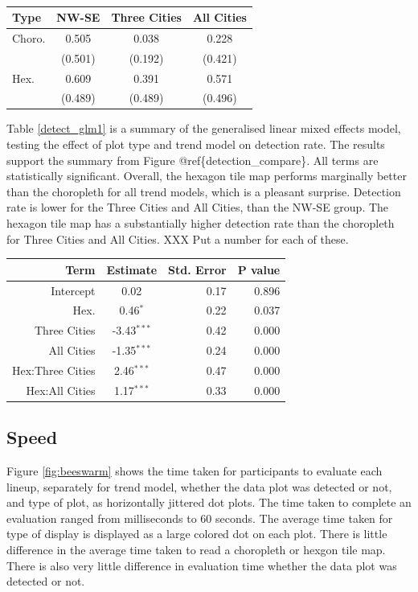 \documentclass[conference,final,]{IEEEtran}
\begin{document}
\begin{table}

\caption{\label{tab:desc_stats}}
\centering
\begin{tabular}[t]{lccc}
\toprule
Type & NW-SE & Three Cities & All Cities\\
\midrule
Choro. & 0.505 & 0.038 & 0.228\\
 & (0.501) & (0.192) & (0.421)\\
Hex. & 0.609 & 0.391 & 0.571\\
 & (0.489) & (0.489) & (0.496)\\
\bottomrule
\end{tabular}
\end{table}

Table \ref{detect_glm1} is a summary of the generalised linear mixed
effects model, testing the effect of plot type and trend model on
detection rate. The results support the summary from Figure
@ref\{detection\_compare\}. All terms are statistically significant.
Overall, the hexagon tile map performs marginally better than the
choropleth for all trend models, which is a pleasant surprise. Detection
rate is lower for the Three Cities and All Cities, than the NW-SE group.
The hexagon tile map has a substantially higher detection rate than the
choropleth for Three Cities and All Cities. XXX Put a number for each of
these.

\begin{tabular}{rcrr}
\toprule
Term & Estimate & Std. Error & P value\\
\midrule
Intercept & 0.02 & 0.17 & 0.896\\
Hex. & 0.46$^{*  }$ & 0.22 & 0.037\\
Three Cities & -3.43$^{***}$ & 0.42 & 0.000\\
All Cities & -1.35$^{***}$ & 0.24 & 0.000\\
Hex:Three Cities & 2.46$^{***}$ & 0.47 & 0.000\\
\addlinespace
Hex:All Cities & 1.17$^{***}$ & 0.33 & 0.000\\
\bottomrule
\end{tabular}

\hypertarget{speed}{%
\subsection{Speed}\label{speed}}

Figure \ref{fig:beeswarm} shows the time taken for participants to
evaluate each lineup, separately for trend model, whether the data plot
was detected or not, and type of plot, as horizontally jittered dot
plots. The time taken to complete an evaluation ranged from milliseconds
to 60 seconds. The average time taken for type of display is displayed
as a large colored dot on each plot. There is little difference in the
average time taken to read a choropleth or hexgon tile map. There is
also very little difference in evaluation time whether the data plot was
detected or not.
\end{document}

